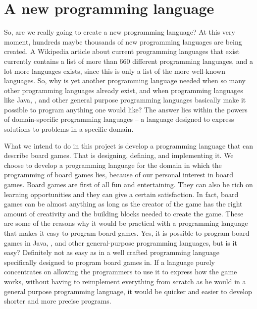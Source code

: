 \chapter{A new programming language}
\label{chap:introduction}
So, are we really going to create a new programming language? At this very
moment, hundreds maybe thousands of new programming languages are being created.
A Wikipedia article about current programming languages that exist currently
contains a list of more than $660$ different programming languages\cite{listofprogramminglanguages}, and a lot more languages exists, since this
is only a list of the more well-known languages. So, why is yet another
programming language needed when so many other programming languages
already exist, and when programming languages like Java, \CS{}, and other general purpose
programming languages basically make it possible to program anything one would
like? The answer lies within the powers of domain-specific programming languages
-- a language designed to express solutions to problems in a specific
domain\cite{domainspecificprogramminglanguagedefinition}.

What we intend to do in this project is develop a programming language that can
describe board games. That is designing, defining, and implementing it. We
choose to develop a programming language for the domain in which the programming
of board games lies, because of our personal interest in board games.
Board games are first of all fun and entertaining. They can also be rich on
learning opportunities\cite{whyboardgames1?} and they can give a certain
satisfaction\cite{whyboardgames2?}. In fact, board games can be almost anything
as long as the creator of the game has the right amount of creativity and the
building blocks needed to create the game. These are some of the reasons why it
would be practical with a programming language that makes it easy to program
board games. Yes, it is possible to program board games in Java, \CS{}, and 
other general-purpose programming languages, but is it easy? Definitely not as
easy as in a well crafted programming language specifically designed to program
board games in. If a language purely concentrates on allowing the programmers to
use it to express how the game works, without having to reimplement everything
from scratch as he would in a general purpose programming language, it would be
quicker and easier to develop shorter and more precise programs.  

